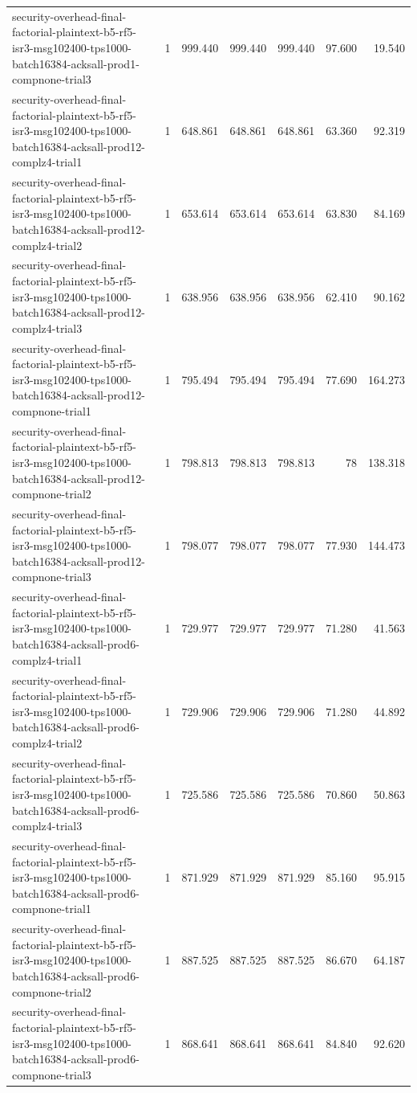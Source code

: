 \begin{tabular}{lrrrrrr}
security-overhead-final-factorial-plaintext-b5-rf5-isr3-msg102400-tps1000-batch16384-acksall-prod1-compnone-trial3 & 1 & 999.440 & 999.440 & 999.440 & 97.600 & 19.540 \\
security-overhead-final-factorial-plaintext-b5-rf5-isr3-msg102400-tps1000-batch16384-acksall-prod12-complz4-trial1 & 1 & 648.861 & 648.861 & 648.861 & 63.360 & 92.319 \\
security-overhead-final-factorial-plaintext-b5-rf5-isr3-msg102400-tps1000-batch16384-acksall-prod12-complz4-trial2 & 1 & 653.614 & 653.614 & 653.614 & 63.830 & 84.169 \\
security-overhead-final-factorial-plaintext-b5-rf5-isr3-msg102400-tps1000-batch16384-acksall-prod12-complz4-trial3 & 1 & 638.956 & 638.956 & 638.956 & 62.410 & 90.162 \\
security-overhead-final-factorial-plaintext-b5-rf5-isr3-msg102400-tps1000-batch16384-acksall-prod12-compnone-trial1 & 1 & 795.494 & 795.494 & 795.494 & 77.690 & 164.273 \\
security-overhead-final-factorial-plaintext-b5-rf5-isr3-msg102400-tps1000-batch16384-acksall-prod12-compnone-trial2 & 1 & 798.813 & 798.813 & 798.813 & 78 & 138.318 \\
security-overhead-final-factorial-plaintext-b5-rf5-isr3-msg102400-tps1000-batch16384-acksall-prod12-compnone-trial3 & 1 & 798.077 & 798.077 & 798.077 & 77.930 & 144.473 \\
security-overhead-final-factorial-plaintext-b5-rf5-isr3-msg102400-tps1000-batch16384-acksall-prod6-complz4-trial1 & 1 & 729.977 & 729.977 & 729.977 & 71.280 & 41.563 \\
security-overhead-final-factorial-plaintext-b5-rf5-isr3-msg102400-tps1000-batch16384-acksall-prod6-complz4-trial2 & 1 & 729.906 & 729.906 & 729.906 & 71.280 & 44.892 \\
security-overhead-final-factorial-plaintext-b5-rf5-isr3-msg102400-tps1000-batch16384-acksall-prod6-complz4-trial3 & 1 & 725.586 & 725.586 & 725.586 & 70.860 & 50.863 \\
security-overhead-final-factorial-plaintext-b5-rf5-isr3-msg102400-tps1000-batch16384-acksall-prod6-compnone-trial1 & 1 & 871.929 & 871.929 & 871.929 & 85.160 & 95.915 \\
security-overhead-final-factorial-plaintext-b5-rf5-isr3-msg102400-tps1000-batch16384-acksall-prod6-compnone-trial2 & 1 & 887.525 & 887.525 & 887.525 & 86.670 & 64.187 \\
security-overhead-final-factorial-plaintext-b5-rf5-isr3-msg102400-tps1000-batch16384-acksall-prod6-compnone-trial3 & 1 & 868.641 & 868.641 & 868.641 & 84.840 & 92.620 \\

\end{tabular}
